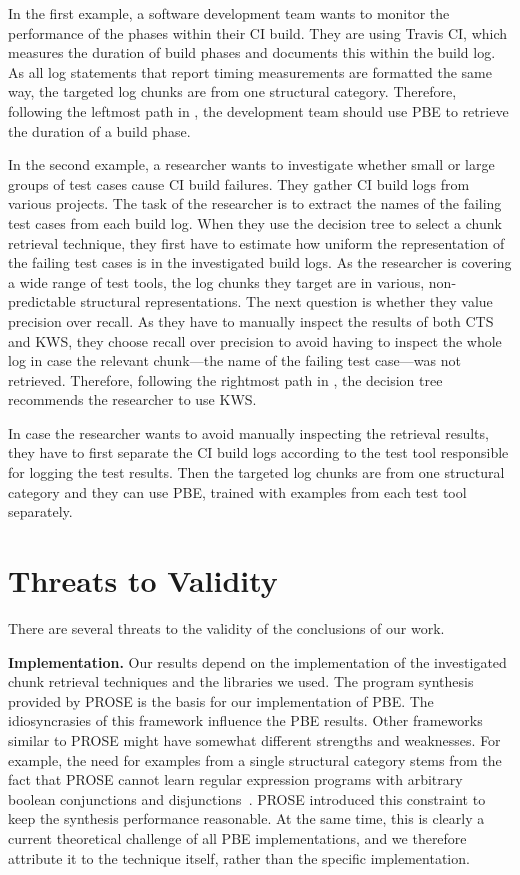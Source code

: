 In the first example, a software development team wants to monitor
the performance of the phases within their CI build.
They are using
Travis CI, which measures the duration of build phases and documents
this within the build log.
As all log statements that report timing
measurements are formatted the same way, the targeted log chunks are
from one structural category.
Therefore, following the leftmost path in
,
the development team should use
PBE to retrieve the duration of a build phase.

In the second example, a researcher wants to investigate whether
small or large groups of test cases
cause CI build failures.
They gather
CI build logs from various projects.
The task of the researcher is to extract the names of the
failing test cases from each build log.
When they use the
decision tree to select a chunk retrieval technique, they
first have to estimate how uniform the representation of the failing
test cases is in the investigated build logs.
As the researcher is
covering a wide range of test tools, the
log chunks they target are in various, non-predictable structural
representations.
The next question is whether they value precision
over recall.
As they have to manually inspect the results of both CTS
and KWS, they choose recall over precision to avoid having to inspect
the whole log in case the relevant chunk---the name of the failing
test case---was not retrieved.
Therefore, following the rightmost path in
,
the decision tree recommends the researcher to use KWS\@.

In case the researcher wants to avoid manually inspecting the
retrieval results, they have to first separate the CI build logs
according to the test tool responsible for logging the test results.
Then the targeted log chunks are from one structural category and they
can use PBE, trained with examples from each test tool separately.

\section{Threats to Validity}
There are several threats to the validity of the conclusions of our
work.

\textbf{Implementation.}
Our results depend on the implementation of the investigated chunk
retrieval techniques and the libraries we used.
The program synthesis provided by PROSE is the basis for our
implementation of PBE\@.
The
idiosyncrasies of this framework influence the PBE results.
Other
frameworks similar to PROSE might have somewhat different strengths
and weaknesses.
For example, the need for examples from a single
structural category stems from the fact that PROSE cannot learn
regular expression programs with arbitrary boolean conjunctions and
disjunctions~\cite{mayer2015user}.
PROSE introduced this constraint to
keep the synthesis performance reasonable.
At the same time, this is
clearly a current theoretical challenge of all PBE implementations,
and we therefore attribute it to the technique itself, rather than the
specific implementation.

